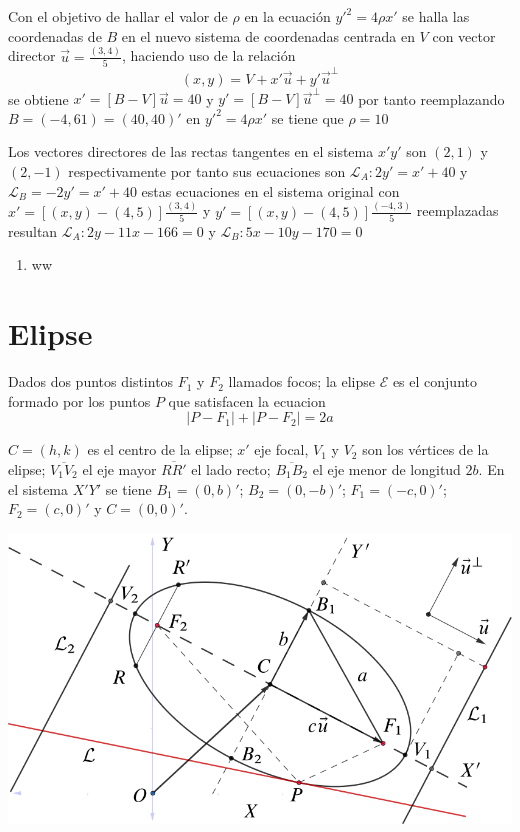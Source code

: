 \documentclass[12pt,]{report}
\providecommand{\tightlist}{%
  \setlength{\itemsep}{0pt}\setlength{\parskip}{0pt}}
\let\origfigure=\figure
\let\endorigfigure=\endfigure
\renewenvironment{figure}[1][]{%
  \origfigure[H]
}{%
  \endorigfigure
}
\theoremstyle{slplain}
\begin{document}
Con el objetivo de hallar el valor de \(\rho\) en la ecuación \(y'^2=4\rho x'\) se halla las coordenadas de \(B\) en el nuevo sistema de coordenadas centrada en \(V\) con vector director \(\vec{u}=\frac{(3,4)}{5}\), haciendo uso de la relación \[(x,y)=V+x'\vec{u}+y'\vec{u}^\perp\] se obtiene \(x'=\left[B-V\right]\vec{u}=40\) y \(y'=\left[B-V\right]\vec{u}^\perp=40\) por tanto reemplazando \(B=(-4,61)=(40,40)'\) en \(y'^2=4\rho x'\) se tiene que \(\rho=10\)

Los vectores directores de las rectas tangentes en el sistema \(x'y'\) son \((2,1)\) y \((2,-1)\) respectivamente por tanto sus ecuaciones son \(\mathcal{L}_A: 2y'=x'+40\) y \(\mathcal{L}_B=-2y'=x'+40\) estas ecuaciones en el sistema original con \(x'=\left[(x,y)-(4,5)\right]\frac{(3,4)}{5}\) y \(y'=\left[(x,y)-(4,5)\right]\frac{(-4,3)}{5}\) reemplazadas resultan \(\mathcal{L}_A:2y-11x-166=0\) y \(\mathcal{L}_B:5x-10y-170=0\)

\begin{enumerate}
\def\labelenumi{\arabic{enumi}.}
\tightlist
\item
  ww
\end{enumerate}

\hypertarget{elipse}{%
\chapter{Elipse}\label{elipse}}

Dados dos puntos distintos \(F_1\) y \(F_2\) llamados focos; la elipse \(\mathcal{E}\) es el conjunto formado por los puntos \(P\) que satisfacen la ecuacion
\begin{equation} 
\left|P-F_1\right|+\left|P-F_2\right|=2a
\label{eq:binom}
\end{equation}

\(C=(h,k)\) es el centro de la elipse; \(x'\) eje focal, \(V_1\) y \(V_2\) son los vértices de la elipse; \(\overline{V_1V_2}\) el eje mayor \(\overline{RR'}\) el lado recto; \(\overline{B_1B_2}\) el eje menor de longitud \(2b\). En el sistema \(X'Y'\) se tiene \(B_1=(0,b)'\); \(B_2=(0,-b)'\); \(F_1=(-c,0)'\); \(F_2=(c,0)'\) y \(C=(0,0)'\).

\begin{figure}

{\centering \includegraphics{elipse} 

}

\caption{Elipse vectorial}\label{fig:pressure1}
\end{figure}
\end{document}
